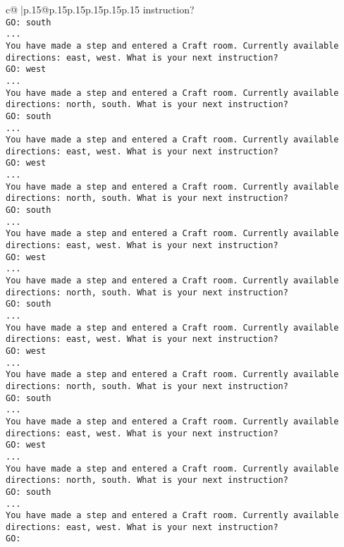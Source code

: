 \documentclass{article}
\begin{document}
{\begin{supertabular}{c@{$\;$}|p{.15\linewidth}@{}p{.15\linewidth}p{.15\linewidth}p{.15\linewidth}p{.15\linewidth}p{.15\linewidth}}
{{{instruction?\\ \tt GO: south\\ \tt ...\\ \tt You have made a step and entered a Craft room. Currently available directions: east, west. What is your next instruction?\\ \tt GO: west\\ \tt ...\\ \tt You have made a step and entered a Craft room. Currently available directions: north, south. What is your next instruction?\\ \tt GO: south\\ \tt ...\\ \tt You have made a step and entered a Craft room. Currently available directions: east, west. What is your next instruction?\\ \tt GO: west\\ \tt ...\\ \tt You have made a step and entered a Craft room. Currently available directions: north, south. What is your next instruction?\\ \tt GO: south\\ \tt ...\\ \tt You have made a step and entered a Craft room. Currently available directions: east, west. What is your next instruction?\\ \tt GO: west\\ \tt ...\\ \tt You have made a step and entered a Craft room. Currently available directions: north, south. What is your next instruction?\\ \tt GO: south\\ \tt ...\\ \tt You have made a step and entered a Craft room. Currently available directions: east, west. What is your next instruction?\\ \tt GO: west\\ \tt ...\\ \tt You have made a step and entered a Craft room. Currently available directions: north, south. What is your next instruction?\\ \tt GO: south\\ \tt ...\\ \tt You have made a step and entered a Craft room. Currently available directions: east, west. What is your next instruction?\\ \tt GO: west\\ \tt ...\\ \tt You have made a step and entered a Craft room. Currently available directions: north, south. What is your next instruction?\\ \tt GO: south\\ \tt ...\\ \tt You have made a step and entered a Craft room. Currently available directions: east, west. What is your next instruction?\\ \tt GO: }}}
\end{supertabular}}
\end{document}
